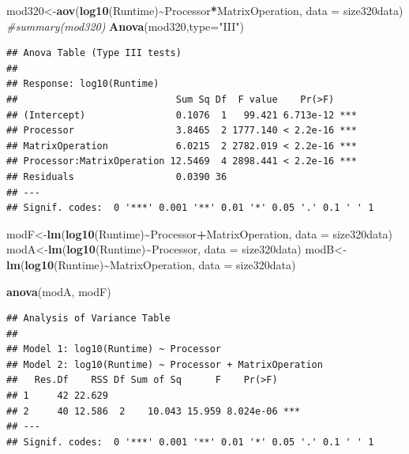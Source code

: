 \documentclass[
]{article}
\newenvironment{Shaded}{\begin{snugshade}}{\end{snugshade}}
\newcommand{\CommentTok}[1]{\textcolor[rgb]{0.56,0.35,0.01}{\textit{#1}}}
\newcommand{\DataTypeTok}[1]{\textcolor[rgb]{0.13,0.29,0.53}{#1}}
\newcommand{\KeywordTok}[1]{\textcolor[rgb]{0.13,0.29,0.53}{\textbf{#1}}}
\newcommand{\NormalTok}[1]{#1}
\newcommand{\OperatorTok}[1]{\textcolor[rgb]{0.81,0.36,0.00}{\textbf{#1}}}
\newcommand{\StringTok}[1]{\textcolor[rgb]{0.31,0.60,0.02}{#1}}
\begin{document}
\begin{Shaded}
\begin{Highlighting}[]
\NormalTok{mod320\textless{}{-}}\KeywordTok{aov}\NormalTok{(}\KeywordTok{log10}\NormalTok{(Runtime)}\OperatorTok{\textasciitilde{}}\NormalTok{Processor}\OperatorTok{*}\NormalTok{MatrixOperation, }\DataTypeTok{data =}\NormalTok{ size320data)}
\CommentTok{\#summary(mod320)}
\KeywordTok{Anova}\NormalTok{(mod320,}\DataTypeTok{type=}\StringTok{"III"}\NormalTok{)}
\end{Highlighting}
\end{Shaded}

\begin{verbatim}
## Anova Table (Type III tests)
## 
## Response: log10(Runtime)
##                            Sum Sq Df  F value    Pr(>F)    
## (Intercept)                0.1076  1   99.421 6.713e-12 ***
## Processor                  3.8465  2 1777.140 < 2.2e-16 ***
## MatrixOperation            6.0215  2 2782.019 < 2.2e-16 ***
## Processor:MatrixOperation 12.5469  4 2898.441 < 2.2e-16 ***
## Residuals                  0.0390 36                       
## ---
## Signif. codes:  0 '***' 0.001 '**' 0.01 '*' 0.05 '.' 0.1 ' ' 1
\end{verbatim}

\begin{Shaded}
\begin{Highlighting}[]
\NormalTok{modF\textless{}{-}}\KeywordTok{lm}\NormalTok{(}\KeywordTok{log10}\NormalTok{(Runtime)}\OperatorTok{\textasciitilde{}}\NormalTok{Processor}\OperatorTok{+}\NormalTok{MatrixOperation, }\DataTypeTok{data =}\NormalTok{ size320data)}
\NormalTok{modA\textless{}{-}}\KeywordTok{lm}\NormalTok{(}\KeywordTok{log10}\NormalTok{(Runtime)}\OperatorTok{\textasciitilde{}}\NormalTok{Processor, }\DataTypeTok{data =}\NormalTok{ size320data)}
\NormalTok{modB\textless{}{-}}\KeywordTok{lm}\NormalTok{(}\KeywordTok{log10}\NormalTok{(Runtime)}\OperatorTok{\textasciitilde{}}\NormalTok{MatrixOperation, }\DataTypeTok{data =}\NormalTok{ size320data)}

\KeywordTok{anova}\NormalTok{(modA, modF)}
\end{Highlighting}
\end{Shaded}

\begin{verbatim}
## Analysis of Variance Table
## 
## Model 1: log10(Runtime) ~ Processor
## Model 2: log10(Runtime) ~ Processor + MatrixOperation
##   Res.Df    RSS Df Sum of Sq      F    Pr(>F)    
## 1     42 22.629                                  
## 2     40 12.586  2    10.043 15.959 8.024e-06 ***
## ---
## Signif. codes:  0 '***' 0.001 '**' 0.01 '*' 0.05 '.' 0.1 ' ' 1
\end{verbatim}
\end{document}
